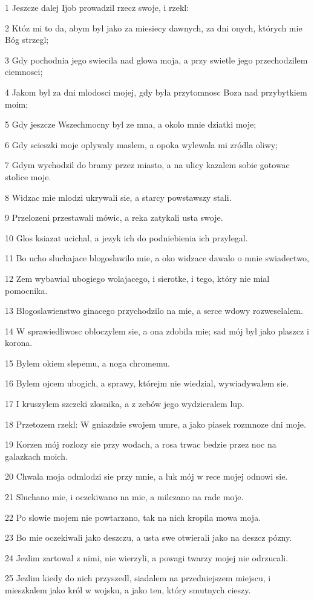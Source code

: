 \par 1 Jeszcze dalej Ijob prowadzil rzecz swoje, i rzekl:
\par 2 Któz mi to da, abym byl jako za miesiecy dawnych, za dni onych, których mie Bóg strzegl;
\par 3 Gdy pochodnia jego swiecila nad glowa moja, a przy swietle jego przechodzilem ciemnosci;
\par 4 Jakom byl za dni mlodosci mojej, gdy byla przytomnosc Boza nad przybytkiem moim;
\par 5 Gdy jeszcze Wszechmocny byl ze mna, a okolo mnie dziatki moje;
\par 6 Gdy scieszki moje oplywaly maslem, a opoka wylewala mi zródla oliwy;
\par 7 Gdym wychodzil do bramy przez miasto, a na ulicy kazalem sobie gotowac stolice moje.
\par 8 Widzac mie mlodzi ukrywali sie, a starcy powstawszy stali.
\par 9 Przelozeni przestawali mówic, a reka zatykali usta swoje.
\par 10 Glos ksiazat ucichal, a jezyk ich do podniebienia ich przylegal.
\par 11 Bo ucho sluchajace blogoslawilo mie, a oko widzace dawalo o mnie swiadectwo,
\par 12 Zem wybawial ubogiego wolajacego, i sierotke, i tego, który nie mial pomocnika.
\par 13 Blogoslawienstwo ginacego przychodzilo na mie, a serce wdowy rozweselalem.
\par 14 W sprawiedliwosc obloczylem sie, a ona zdobila mie; sad mój byl jako plaszcz i korona.
\par 15 Bylem okiem slepemu, a noga chromemu.
\par 16 Bylem ojcem ubogich, a sprawy, którejm nie wiedzial, wywiadywalem sie.
\par 17 I kruszylem szczeki zlosnika, a z zebów jego wydzieralem lup.
\par 18 Przetozem rzekl: W gniazdzie swojem umre, a jako piasek rozmnoze dni moje.
\par 19 Korzen mój rozlozy sie przy wodach, a rosa trwac bedzie przez noc na galazkach moich.
\par 20 Chwala moja odmlodzi sie przy mnie, a luk mój w rece mojej odnowi sie.
\par 21 Sluchano mie, i oczekiwano na mie, a milczano na rade moje.
\par 22 Po slowie mojem nie powtarzano, tak na nich kropila mowa moja.
\par 23 Bo mie oczekiwali jako deszczu, a usta swe otwierali jako na deszcz pózny.
\par 24 Jezlim zartowal z nimi, nie wierzyli, a powagi twarzy mojej nie odrzucali.
\par 25 Jezlim kiedy do nich przyszedl, siadalem na przedniejszem miejscu, i mieszkalem jako król w wojsku, a jako ten, który smutnych cieszy.

